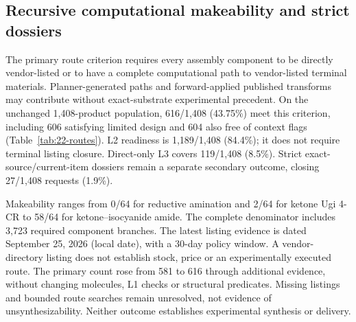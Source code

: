 \subsection{Recursive computational makeability and strict dossiers}
The primary route criterion requires every assembly component to be directly vendor-listed or to
have a complete computational path to vendor-listed terminal materials. Planner-generated paths
and forward-applied published transforms may contribute without exact-substrate experimental
precedent. On the unchanged 1,408-product population, 616/1,408 (43.75\%) meet this criterion,
including 606 satisfying limited design and 604 also free of context flags
(Table~\ref{tab:22-routes}). L2 readiness is 1,189/1,408 (84.4\%); it does not require terminal
listing closure. Direct-only L3 covers 119/1,408 (8.5\%). Strict exact-source/current-item dossiers
remain a separate secondary outcome, closing 27/1,408 requests (1.9\%).

Makeability ranges from 0/64 for reductive amination and 2/64 for ketone Ugi 4-CR to 58/64 for
ketone--isocyanide amide. The complete denominator includes 3,723 required component branches.
The latest listing evidence is dated September 25, 2026 (local date), with a 30-day policy window.
A vendor-directory listing does not establish stock, price or an experimentally executed route.
The primary count rose from 581 to 616 through additional evidence, without changing molecules,
L1 checks or structural predicates. Missing listings and bounded route searches remain unresolved,
not evidence of unsynthesizability. Neither outcome establishes experimental synthesis or delivery.
